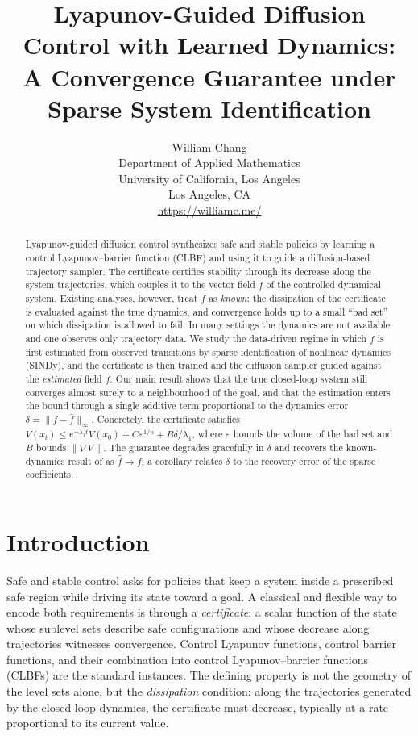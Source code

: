 \documentclass{article}
\title{Lyapunov-Guided Diffusion Control with Learned Dynamics:\\
A Convergence Guarantee under Sparse System Identification}
\date{} 					%
\author{ \href{https://orcid.org/0000-0003-1700-756X}{William Chang} \\
	Department of Applied Mathematics\\
	University of California, Los Angeles\\
	Los Angeles, CA \\
	\url{https://williamc.me/} \\
	\And
}
\newcommand{\eps}{\varepsilon}
\newcommand{\hf}{\hat{f}}
\begin{document}
\maketitle
\begin{abstract}
Lyapunov-guided diffusion control synthesizes safe and stable policies by
learning a control Lyapunov--barrier function (CLBF) and using it to guide a
diffusion-based trajectory sampler. The certificate certifies stability through
its decrease along the system trajectories, which couples it to the vector field
$f$ of the controlled dynamical system. Existing analyses, however, treat $f$ as
\emph{known}: the dissipation of the certificate is evaluated against the true
dynamics, and convergence holds up to a small ``bad set'' on which dissipation is
allowed to fail. In many settings the dynamics are not available and one observes
only trajectory data. We study the data-driven regime in which $f$ is first
estimated from observed transitions by sparse identification of nonlinear
dynamics (SINDy), and the certificate is then trained and the diffusion sampler
guided against the \emph{estimated} field $\hf$. Our main result shows that the
true closed-loop system still converges almost surely to a neighbourhood of the
goal, and that the estimation enters the bound through a single additive term
proportional to the dynamics error $\delta=\|f-\hf\|_\infty$. Concretely, the
certificate satisfies $V(x_t)\le e^{-\lambda_1 t}V(x_0)+C\eps^{1/n}+B\delta/\lambda_1$,
where $\eps$ bounds the volume of the bad set and $B$ bounds $\|\nabla V\|$. The
guarantee degrades gracefully in $\delta$ and recovers the known-dynamics result
of \citet{cheng2026safe} as $\hf\to f$; a corollary relates $\delta$ to the
recovery error of the sparse coefficients.
\end{abstract}


\section{Introduction}

Safe and stable control asks for policies that keep a system inside a prescribed
safe region while driving its state toward a goal. A classical and flexible way
to encode both requirements is through a \emph{certificate}: a scalar function of
the state whose sublevel sets describe safe configurations and whose decrease
along trajectories witnesses convergence. Control Lyapunov functions, control
barrier functions, and their combination into control Lyapunov--barrier functions
(CLBFs) are the standard instances. The defining property is not the geometry of
the level sets alone, but the \emph{dissipation} condition: along the trajectories
generated by the closed-loop dynamics, the certificate must decrease, typically at
a rate proportional to its current value.
\end{document}
